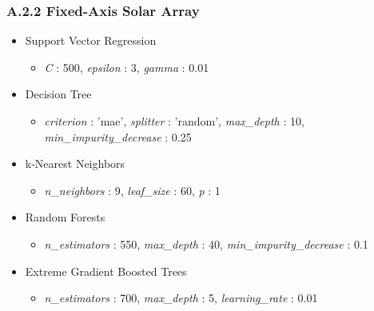 \subsubsection*{A.2.2 \hspace{0.5em} Fixed-Axis Solar Array}
\begin{itemize}
    \item Support Vector Regression
    \begin{itemize}
        \item \textit{C} : 500, \textit{epsilon} : 3,  \textit{gamma} : 0.01 
    \end{itemize}

    \item Decision Tree 
    \begin{itemize}
        \item \textit{criterion} : 'mae', \textit{splitter} : 'random', \textit{max\_depth} : 10, \textit{min\_impurity\_decrease} : 0.25 
    \end{itemize}

    \item k-Nearest Neighbors 
    \begin{itemize}
        \item \textit{n\_neighbors} : 9, \textit{leaf\_size} : 60, \textit{p} : 1
    \end{itemize}

    \item Random Forests 
    \begin{itemize}
        \item \textit{n\_estimators} : 550, \textit{max\_depth} : 40, \textit{min\_impurity\_decrease} : 0.1
    \end{itemize}

    \item Extreme Gradient Boosted Trees
    \begin{itemize}
        \item \textit{n\_estimators} : 700, \textit{max\_depth} : 5, \textit{learning\_rate} : 0.01
    \end{itemize}

\end{itemize}

